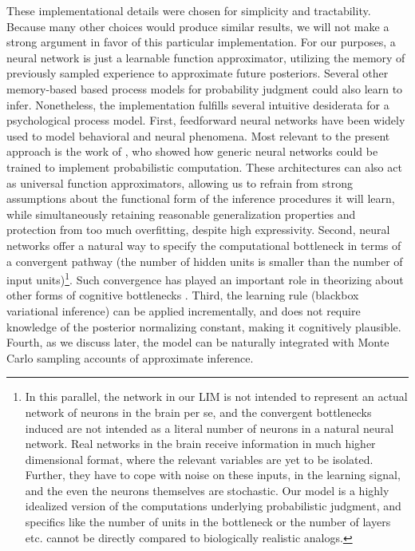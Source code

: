 These implementational details were chosen for simplicity and tractability. Because many other choices would produce similar results, we will not make a strong argument in favor of this particular implementation. For our purposes, a neural network is just a learnable function approximator, utilizing the memory of previously sampled experience to approximate future posteriors. Several other memory-based based process models for probability judgment \citep[for example:][]{dougherty1999minerva, shi2010exemplar, dasgupta2018remembrance, stewart2006decision, hertwig2009description} could also learn to infer. Nonetheless, the implementation fulfills several intuitive desiderata for a psychological process model. First, feedforward neural networks have been widely used to model behavioral and neural phenomena. Most relevant to the present approach is the work of \citet{orhan2017efficient}, who showed how generic neural networks could be trained to implement probabilistic computation. These architectures can also act as universal function approximators, allowing us to refrain from strong assumptions about the functional form of the inference procedures it will learn, while simultaneously retaining reasonable generalization properties and protection from too much overfitting, despite high expressivity\citep{zhang2016understanding, neyshabur2017exploring}. Second, neural networks offer a natural way to specify the computational bottleneck in terms of a convergent pathway (the number of hidden units is smaller than the number of input units)\footnote{In this parallel, the network in our LIM is not intended to represent an actual network of neurons in the brain per se, and the convergent bottlenecks induced are not intended as a literal number of neurons in a natural neural network. Real networks in the brain receive information in much higher dimensional format, where the relevant variables are yet to be isolated. Further, they have to cope with noise on these inputs, in the learning signal, and the even the neurons themselves are stochastic. Our model is a highly idealized version of the computations underlying probabilistic judgment, and specifics like the number of units in the bottleneck or the number of layers etc. cannot be directly compared to biologically realistic analogs.}. Such convergence has played an important role in theorizing about other forms of cognitive bottlenecks \citep[e.g.,][]{feng2014multitasking,alon2017graph}. Third, the learning rule (blackbox variational inference) can be applied incrementally, and does not require knowledge of the posterior normalizing constant, making it cognitively plausible. Fourth, as we discuss later, the model can be naturally integrated with Monte Carlo sampling accounts of approximate inference.

